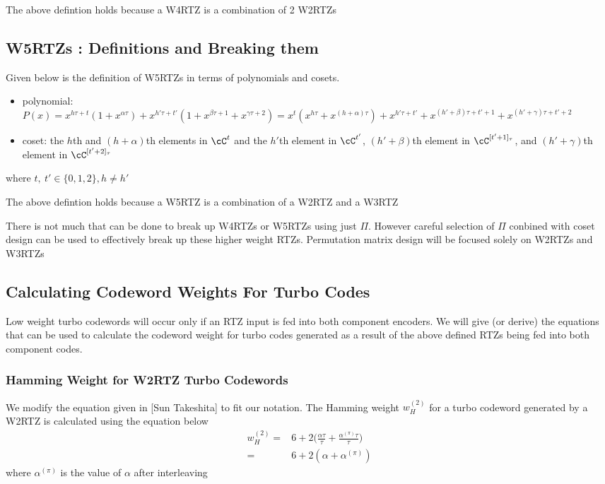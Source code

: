 The above defintion holds because a W4RTZ is a combination of 2 W2RTZs

\subsection{W5RTZs : Definitions and Breaking them}
Given below is the definition of W5RTZs in terms of polynomials and cosets.
\begin{itemize}
	\item polynomial: $P(x)=x^{h\tau+t}(1+x^{\alpha \tau}) 
	+
	x^{h'\tau+t'}(1+x^{\beta \tau +1}+x^{\gamma \tau +2})= 
	x^t(x^{h\tau}+x^{(h+\alpha)\tau}) 
	+x^{h'\tau+t'}+x^{(h'+\beta) \tau +t'+1}+x^{(h'+\gamma) \tau +t'+2}
	$
	\item coset: the $h$th and $(h+\alpha)$th elements in $\cC^t$ and  the 
	$h'$th element in $\cC^{t'}$, $(h'+\beta)$th element in $\cC^{[t'+1]_\tau}$, and $(h'+\gamma)$th element in $\cC^{[t'+2]_\tau}$
\end{itemize}
where $t,~t' \in\{0,1,2\},h \neq h'$

The above defintion holds because a W5RTZ is a combination of a W2RTZ and a W3RTZ

There is not much that can be done to break up W4RTZs or W5RTZs using just $\Pi$. However careful selection of $\Pi$ conbined with coset design can be used to effectively break up these higher weight RTZs. Permutation matrix design will be focused solely on W2RTZs and W3RTZs

\subsection{Calculating Codeword Weights For Turbo Codes}
Low weight turbo codewords will occur only if an RTZ input is fed into both component encoders. We will give (or derive) the equations that can be used to calculate the codeword weight for turbo codes generated as a result of the above defined RTZs being fed into both component codes.

\subsubsection{Hamming Weight for W2RTZ Turbo Codewords }
We modify the equation given in [Sun Takeshita] to fit our notation. The Hamming weight $w^{(2)}_H$ for a turbo codeword generated by a W2RTZ is calculated using the equation below 
\begin{equation}
\begin{split}
w^{(2)}_H=&6+2\Big(\frac{\alpha \tau}{\tau}+\frac{\alpha^{(\pi)}\tau}{\tau}\Big)\\
=& 6 +2(\alpha + \alpha^{(\pi)})
\end{split}
\label{RTZinputs-1}
\end{equation}
where $\alpha^{(\pi)}$ is the value of $\alpha$ after interleaving

